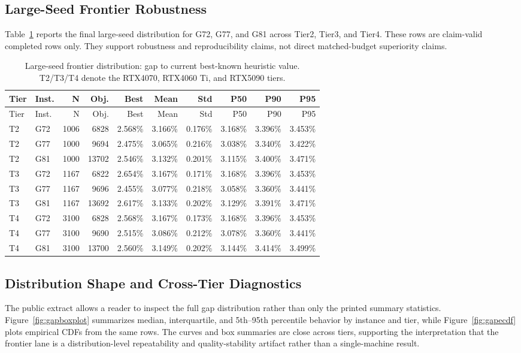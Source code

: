 \documentclass[11pt]{article}
\begin{document}
\subsection{Large-Seed Frontier Robustness}
Table~\ref{tab:frontier} reports the final large-seed distribution for G72, G77, and G81 across Tier2, Tier3, and Tier4. These rows are claim-valid completed rows only. They support robustness and reproducibility claims, not direct matched-budget superiority claims.

\begin{scriptsize}
\begin{longtable}{@{}llrrrrrrrr@{}}
\caption{Large-seed frontier distribution: gap to current best-known heuristic value. T2/T3/T4 denote the RTX4070, RTX4060 Ti, and RTX5090 tiers.}\label{tab:frontier}\\
\toprule
Tier & Inst. & N & Obj. & Best & Mean & Std & P50 & P90 & P95 \\
\midrule
\endfirsthead
\toprule
Tier & Inst. & N & Obj. & Best & Mean & Std & P50 & P90 & P95 \\
\midrule
\endhead
T2 & G72 & 1006 & 6828 & 2.568\% & 3.166\% & 0.176\% & 3.168\% & 3.396\% & 3.453\% \\
T2 & G77 & 1000 & 9694 & 2.475\% & 3.065\% & 0.216\% & 3.038\% & 3.340\% & 3.422\% \\
T2 & G81 & 1000 & 13702 & 2.546\% & 3.132\% & 0.201\% & 3.115\% & 3.400\% & 3.471\% \\
T3 & G72 & 1167 & 6822 & 2.654\% & 3.167\% & 0.171\% & 3.168\% & 3.396\% & 3.453\% \\
T3 & G77 & 1167 & 9696 & 2.455\% & 3.077\% & 0.218\% & 3.058\% & 3.360\% & 3.441\% \\
T3 & G81 & 1167 & 13692 & 2.617\% & 3.133\% & 0.202\% & 3.129\% & 3.391\% & 3.471\% \\
T4 & G72 & 3100 & 6828 & 2.568\% & 3.167\% & 0.173\% & 3.168\% & 3.396\% & 3.453\% \\
T4 & G77 & 3100 & 9690 & 2.515\% & 3.086\% & 0.212\% & 3.078\% & 3.360\% & 3.441\% \\
T4 & G81 & 3100 & 13700 & 2.560\% & 3.149\% & 0.202\% & 3.144\% & 3.414\% & 3.499\% \\
\bottomrule
\end{longtable}
\end{scriptsize}

\clearpage

\subsection{Distribution Shape and Cross-Tier Diagnostics}
The public extract allows a reader to inspect the full gap distribution rather than only the printed summary statistics. Figure~\ref{fig:gapboxplot} summarizes median, interquartile, and 5th--95th percentile behavior by instance and tier, while Figure~\ref{fig:gapecdf} plots empirical CDFs from the same rows. The curves and box summaries are close across tiers, supporting the interpretation that the frontier lane is a distribution-level repeatability and quality-stability artifact rather than a single-machine result.
\end{document}
